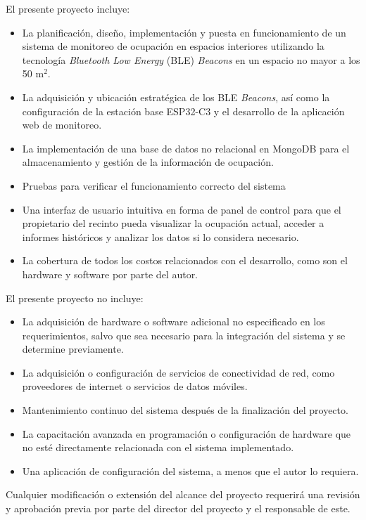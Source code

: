 \documentclass[
11pt, %
]{charter}
\begin{document}
El presente proyecto incluye:
\begin{itemize}
	\item La planificación, diseño, implementación y puesta en funcionamiento de un sistema de monitoreo de ocupación en espacios interiores utilizando la tecnología \textit{Bluetooth Low Energy} (BLE) \textit{Beacons} en un espacio no mayor a los 50 m$^2$.
	\item La adquisición y ubicación estratégica de los BLE \textit{Beacons}, así como la configuración de la estación base ESP32-C3 y el desarrollo de la aplicación web de monitoreo. 
	\item La implementación de una base de datos no relacional en MongoDB para el almacenamiento y gestión de la información de ocupación. 
	\item Pruebas para verificar el funcionamiento correcto del sistema 
	\item Una interfaz de usuario intuitiva en forma de panel de control para que el propietario del recinto pueda visualizar la ocupación actual, acceder a informes históricos y analizar los datos si lo considera necesario.
	\item La cobertura de todos los costos relacionados con el desarrollo, como son el hardware y software por parte del autor.
\end{itemize}


El presente proyecto no incluye:
\begin{itemize}
	\item La adquisición de hardware o software adicional no especificado en los requerimientos, salvo que sea necesario para la integración del sistema y se determine previamente.
	\item La adquisición o configuración de servicios de conectividad de red, como proveedores de internet o servicios de datos móviles.
	\item Mantenimiento continuo del sistema después de la finalización del proyecto.
	\item La capacitación avanzada en programación o configuración de hardware que no esté directamente relacionada con el sistema implementado.
	\item Una aplicación de configuración del sistema, a menos que el autor lo requiera.
\end{itemize}

Cualquier modificación o extensión del alcance del proyecto requerirá una revisión y aprobación previa por parte del director del proyecto y el responsable de este.
\end{document}

